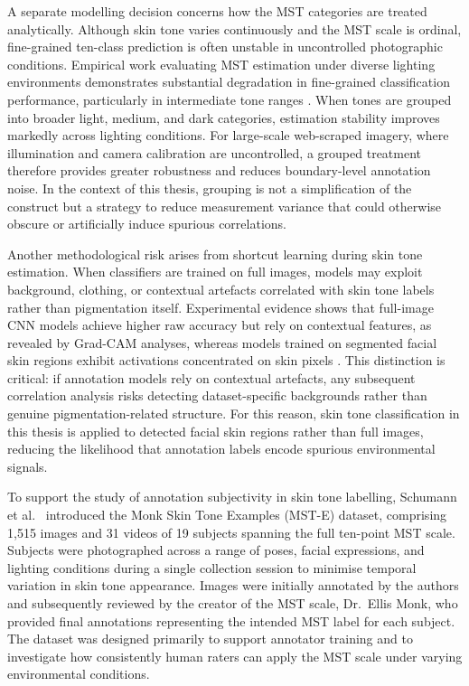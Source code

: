 A separate modelling decision concerns how the MST categories are treated analytically. Although skin tone varies continuously and the MST scale is ordinal, fine-grained ten-class prediction is often unstable in uncontrolled photographic conditions. Empirical work evaluating MST estimation under diverse lighting environments demonstrates substantial degradation in fine-grained classification performance, particularly in intermediate tone ranges \cite{Mbatha_2024_SkinToneLighting}. When tones are grouped into broader light, medium, and dark categories, estimation stability improves markedly across lighting conditions. For large-scale web-scraped imagery, where illumination and camera calibration are uncontrolled, a grouped treatment therefore provides greater robustness and reduces boundary-level annotation noise. In the context of this thesis, grouping is not a simplification of the construct but a strategy to reduce measurement variance that could otherwise obscure or artificially induce spurious correlations.

Another methodological risk arises from shortcut learning during skin tone estimation. When classifiers are trained on full images, models may exploit background, clothing, or contextual artefacts correlated with skin tone labels rather than pigmentation itself. Experimental evidence shows that full-image CNN models achieve higher raw accuracy but rely on contextual features, as revealed by Grad-CAM analyses, whereas models trained on segmented facial skin regions exhibit activations concentrated on skin pixels \cite{Matias_2024_EnhancingFairnessMST}. This distinction is critical: if annotation models rely on contextual artefacts, any subsequent correlation analysis risks detecting dataset-specific backgrounds rather than genuine pigmentation-related structure. For this reason, skin tone classification in this thesis is applied to detected facial skin regions rather than full images, reducing the likelihood that annotation labels encode spurious environmental signals.

To support the study of annotation subjectivity in skin tone labelling,
Schumann et al.~\cite{Schumann_2024_MonkSkinTone} introduced the Monk Skin
Tone Examples (MST-E) dataset, comprising 1,515 images and 31 videos of
19 subjects spanning the full ten-point MST scale. Subjects were photographed
across a range of poses, facial expressions, and lighting conditions during
a single collection session to minimise temporal variation in skin tone
appearance. Images were initially annotated by the authors and subsequently
reviewed by the creator of the MST scale, Dr.\ Ellis Monk, who provided
final annotations representing the intended MST label for each
subject. The dataset was designed primarily to support annotator training
and to investigate how consistently human raters can apply the MST scale
under varying environmental conditions.

